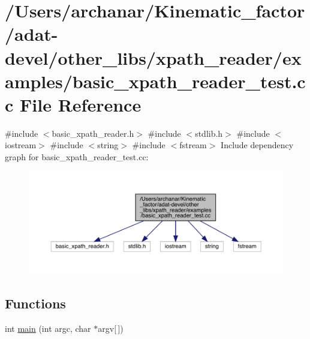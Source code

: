 \hypertarget{adat-devel_2other__libs_2xpath__reader_2examples_2basic__xpath__reader__test_8cc}{}\section{/\+Users/archanar/\+Kinematic\+\_\+factor/adat-\/devel/other\+\_\+libs/xpath\+\_\+reader/examples/basic\+\_\+xpath\+\_\+reader\+\_\+test.cc File Reference}
\label{adat-devel_2other__libs_2xpath__reader_2examples_2basic__xpath__reader__test_8cc}
{\ttfamily \#include $<$basic\+\_\+xpath\+\_\+reader.\+h$>$}\newline
{\ttfamily \#include $<$stdlib.\+h$>$}\newline
{\ttfamily \#include $<$iostream$>$}\newline
{\ttfamily \#include $<$string$>$}\newline
{\ttfamily \#include $<$fstream$>$}\newline
Include dependency graph for basic\+\_\+xpath\+\_\+reader\+\_\+test.\+cc\+:
\nopagebreak
\begin{figure}[H]
\begin{center}
\leavevmode
\includegraphics[width=350pt]{da/df4/adat-devel_2other__libs_2xpath__reader_2examples_2basic__xpath__reader__test_8cc__incl}
\end{center}
\end{figure}
\subsection*{Functions}
\begin{DoxyCompactItemize}
\item 
int \mbox{\hyperlink{adat-devel_2other__libs_2xpath__reader_2examples_2basic__xpath__reader__test_8cc_a0ddf1224851353fc92bfbff6f499fa97}{main}} (int argc, char $\ast$argv\mbox{[}$\,$\mbox{]})
\end{DoxyCompactItemize}


